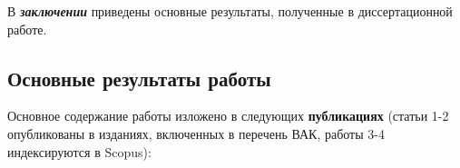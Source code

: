 В \textbf{\textit{заключении}} приведены основные результаты, полученные в диссертационной работе.
\subsection*{Основные результаты работы}




\renewcommand*{\refname}{\vspace*{-13mm}}

\renewcommand{\refname}{\large Публикации автора по теме диссертации}
Основное содержание работы изложено в следующих \textbf{публикациях} (статьи 1-2 опубликованы в изданиях, включенных в перечень ВАК, работы 3-4 индексируются в Scopus):
\nocite{*}
\insertbiblioauthor                          %
